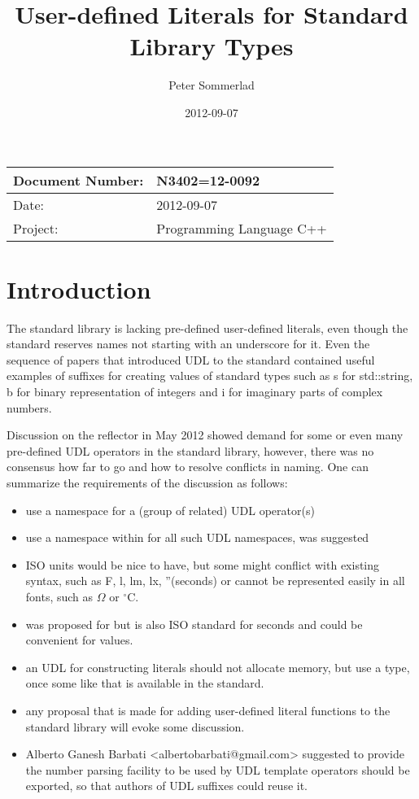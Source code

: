 \documentclass[ebook,11pt,article]{memoir}
\title{User-defined Literals for Standard Library Types}
\author{Peter Sommerlad}
\date{2012-09-07}                                           %
\begin{document}
\maketitle
\begin{tabular}[t]{|l|l|}\hline 
Document Number: &  N3402=12-0092 \\\hline
Date: & 2012-09-07 \\\hline
Project: & Programming Language C++\\\hline 
\end{tabular}

\chapter{Introduction}
The standard library is lacking pre-defined user-defined literals, even though the standard reserves names not starting with an underscore for it. Even the sequence of papers that introduced UDL to the standard contained useful examples of suffixes for creating values of standard types such as s for std::string, b for binary representation of integers and i for imaginary parts of complex numbers.

Discussion on the reflector in May 2012 showed demand for some or even many pre-defined UDL operators in the standard library, however, there was no consensus how far to go and how to resolve conflicts in naming. One can summarize the requirements of the discussion as follows:
\begin{itemize}
\item use a namespace for a (group of related) UDL operator(s)
\item use a namespace within  for all such UDL namespaces,  was suggested
\item ISO units would be nice to have, but some might conflict with existing syntax, such as F, l, lm, lx, ''(seconds) or cannot be represented easily in all fonts, such as $\Omega$ or $^{\circ}\mathrm{C}$.
\item {} was proposed for  but is also ISO standard for seconds and could be convenient for  values.
\item an UDL for constructing  literals should not allocate memory, but use a  type, once some like that is available in the standard.
\item any proposal that is made for adding user-defined literal functions to the standard library will evoke some discussion.
\item Alberto Ganesh Barbati <albertobarbati@gmail.com> suggested to provide the number parsing facility to be used by UDL template operators should be exported, so that authors of UDL suffixes could reuse it.
\end{itemize}
\end{document}
